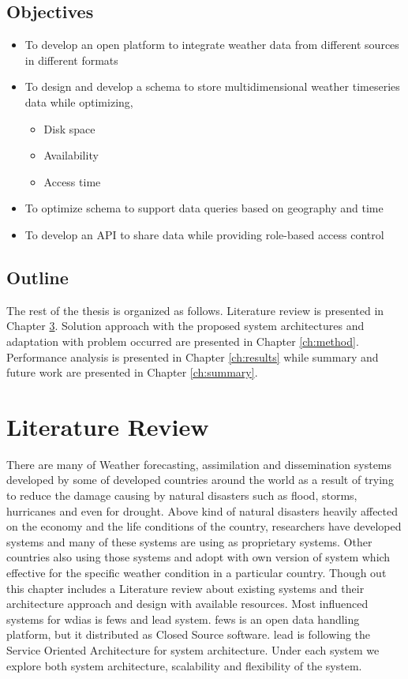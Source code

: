\documentclass[a4paper,oneside,12pt]{report}
\begin{document}
\section{Objectives}
\begin{itemize}
    \item To develop an open platform to integrate weather data from different sources in different formats
    \item To design and develop a schema to store multidimensional weather timeseries data while optimizing,
    \begin{itemize}
        \item Disk space
        \item Availability
        \item Access time
    \end{itemize}
    \item To optimize schema to support data queries based on geography and time
    \item To develop an API to share data while providing role-based access control
\end{itemize}

\section{Outline}
The rest of the thesis is organized as follows. Literature review is presented in Chapter \ref{ch:literature}. Solution approach with the proposed system architectures and adaptation with problem occurred are presented in Chapter \ref{ch:method}. Performance analysis is presented in Chapter \ref{ch:results} while summary and future work are presented in Chapter \ref{ch:summary}.

\chapter{Literature Review}
\label{ch:literature}
There are many of Weather forecasting, assimilation and dissemination systems developed by some of developed countries around the world as a result of trying to reduce the damage causing by natural disasters such as flood, storms, hurricanes and even for drought. Above kind of natural disasters heavily affected on the economy and the life conditions of the country, researchers have developed systems and many of these systems are using as proprietary systems. Other countries also using those systems and adopt with own version of system which effective for the specific weather condition in a particular country.
Though out this chapter includes a Literature review about existing systems and their architecture approach and design with available resources. Most influenced systems for \acrshort{wdias} is \acrshort{fews} and \acrfull{lead} system. \acrshort{fews} is an open data handling platform, but it distributed as Closed Source software. \acrshort{lead} is following the Service Oriented Architecture for system architecture. Under each system we explore both system architecture, scalability and flexibility of the system.
\end{document}
